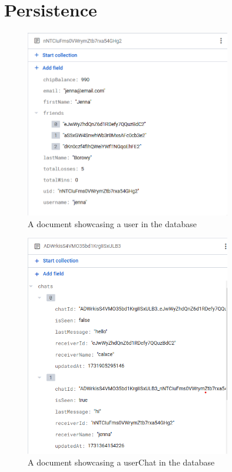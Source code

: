 \section{Persistence}

\begin{figure}[!htb]
    \centering
    \includegraphics[width=0.8\textwidth]{figures/DB Screenshot user.png}
    \caption{A document showcasing a user in the database}
    \label{fig:userDB}
\end{figure}

\begin{figure}[!htb]
    \centering
    \includegraphics[width=0.8\textwidth]{figures/DB Screenshot userChats.png}
    \caption{A document showcasing a userChat in the database}
    \label{fig:userChatDB}
\end{figure}

